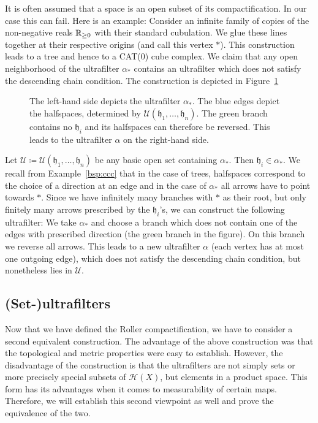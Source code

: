 \begin{rem}
  It is often assumed that a space is an open subset of its compactification. In our case this can fail. Here is an example: Consider an infinite family of copies of the non-negative reals \(\mathbb{R}_{\geq0}\) with their standard cubulation. We glue these lines together at their respective origins (and call this vertex \(\ast\)). This construction leads to a tree and hence to a CAT(0) cube complex. We claim that any open neighborhood of the ultrafilter \(\alpha_\ast\) contains an ultrafilter which does not satisfy the descending chain condition. The construction is depicted in Figure~\ref{fig:roller-counterexample}
  \begin{figure}[htbp]
    \centering
    
    \caption{The left-hand side depicts the ultrafilter \(\alpha_\ast\). The blue edges depict the halfspaces, determined by \(\mathcal{U}(\mathfrak{h}_1, \dots, \mathfrak{h}_n)\). The green branch contains no \(\mathfrak{h}_i\) and its halfspaces can therefore be reversed. This leads to the ultrafilter \(\alpha\) on the right-hand side.}
    \label{fig:roller-counterexample}
  \end{figure}

  Let \(\mathcal{U} \coloneqq \mathcal{U}(\mathfrak{h}_1, \dots, \mathfrak{h}_n)\) be any basic open set containing \(\alpha_\ast\). Then \(\mathfrak{h}_i \in \alpha_\ast\). We recall from Example~\ref{bsp:ccc} that in the case of trees, halfspaces correspond to the choice of a direction at an edge and in the case of \(\alpha_\ast\) all arrows have to point towards \(\ast\). Since we have infinitely many branches with \(\ast\) as their root, but only finitely many arrows prescribed by the \(\mathfrak{h}_i\)'s, we can construct the following ultrafilter: We take \(\alpha_\ast\) and choose a branch which does not contain one of the edges with prescribed direction (the green branch in the figure). On this branch we reverse all arrows. This leads to a new ultrafilter \(\alpha\) (each vertex has at most one outgoing edge), which does not satisfy the descending chain condition, but nonetheless lies in \(\mathcal{U}\).
\end{rem}

\subsection{(Set-)ultrafilters}
\label{sec:set-ultrafilters}

Now that we have defined the Roller compactification, we have to consider a second equivalent construction. The advantage of the above construction was that the topological and metric properties were easy to establish. However, the disadvantage of the construction is that the ultrafilters are not simply sets or more precisely special subsets of \(\mathcal{H}(X)\), but elements in a product space. This form has its advantages when it comes to measurability of certain maps. Therefore, we will establish this second viewpoint as well and prove the equivalence of the two.

